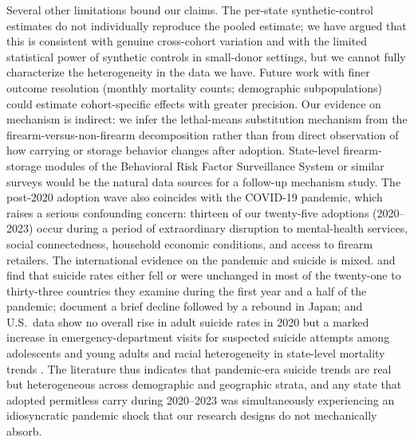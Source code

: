 \documentclass[12pt]{article}
\begin{document}
Several other limitations bound our claims. The per-state
synthetic-control estimates do not individually reproduce the
pooled estimate; we have argued that this is consistent with
genuine cross-cohort variation and with the limited statistical
power of synthetic controls in small-donor settings, but we cannot
fully characterize the heterogeneity in the data we have. Future
work with finer outcome resolution (monthly mortality counts;
demographic subpopulations) could estimate cohort-specific effects
with greater precision. Our evidence on mechanism is indirect: we
infer the lethal-means substitution mechanism from the
firearm-versus-non-firearm decomposition rather than from direct
observation of how carrying or storage behavior changes after
adoption. State-level firearm-storage modules of the Behavioral
Risk Factor Surveillance System or similar surveys would be the
natural data sources for a follow-up mechanism study. The
post-2020 adoption wave also coincides with the COVID-19 pandemic,
which raises a serious confounding concern: thirteen of our
twenty-five adoptions (2020--2023) occur during a period of
extraordinary disruption to mental-health services, social
connectedness, household economic conditions, and access to
firearm retailers. The international evidence on the pandemic and
suicide is mixed. \citet{pirkis2021} and \citet{pirkis2022} find
that suicide rates either fell or were unchanged in most of the
twenty-one to thirty-three countries they examine during the first
year and a half of the pandemic; \citet{tanaka2021} document a
brief decline followed by a rebound in Japan; and U.S.\ data show
no overall rise in adult suicide rates in 2020 \citep{faust2021}
but a marked increase in emergency-department visits for suspected
suicide attempts among adolescents and young adults
\citep{yard2021} and racial heterogeneity in state-level mortality
trends \citep{bray2021}. The literature thus indicates that
pandemic-era suicide trends are real but heterogeneous across
demographic and geographic strata, and any state that adopted
permitless carry during 2020--2023 was simultaneously experiencing
an idiosyncratic pandemic shock that our research designs do not
mechanically absorb.
\end{document}

